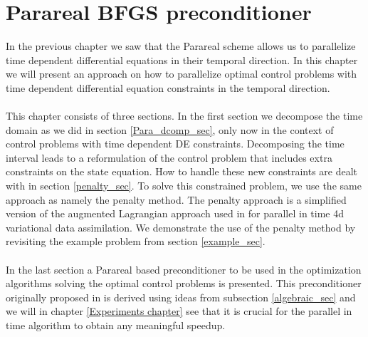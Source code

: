 \chapter{Parareal BFGS preconditioner} \label{method_chap}
In the previous chapter we saw that the Parareal scheme allows us to parallelize time dependent differential equations in their temporal direction. In this chapter we will present an approach on how to parallelize optimal control problems with time dependent differential equation constraints in the temporal direction. 
\\
\\
This chapter consists of three sections. In the first section we decompose the time domain as we did in section \ref{Para_dcomp_sec}, only now in the context of control problems with time dependent DE constraints. Decomposing the time interval leads to a reformulation of the control problem that includes extra constraints on the state equation. How to handle these new constraints are dealt with in section \ref{penalty_sec}. To solve this constrained problem, we use the same approach as \cite{maday2002parareal} namely the penalty method. The penalty approach is a simplified version of the augmented Lagrangian approach used in \cite{rao2016time} for parallel in time 4d variational data assimilation. We demonstrate the use of the penalty method by revisiting the example problem from section \ref{example_sec}.
\\
\\
In the last section a Parareal based preconditioner to be used in the optimization algorithms solving the optimal control problems is presented. This preconditioner originally proposed in \cite{maday2002parareal} is derived using ideas from subsection \ref{algebraic_sec} and we will in chapter \ref{Experiments chapter} see that it is crucial for the parallel in time algorithm to obtain any meaningful speedup. 
